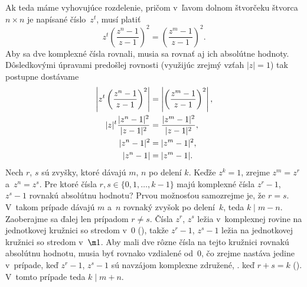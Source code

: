 {Ak teda máme vyhovujúce rozdelenie, pričom v~ľavom dolnom štvorčeku štvorca $n\times n$ je napísané číslo~$z^t$, musí platiť
$$
z^t\left(\frac{z^n-1}{z-1}\right)^2=\left(\frac{z^m-1}{z-1}\right)^2.
$$
Aby sa dve komplexné čísla rovnali, musia sa rovnať aj ich absolútne hodnoty. Dôsledkovými úpravami predošlej rovnosti (využijúc zrejmý vzťah $|z|=1$) tak postupne dostávame
$$
\aligned
\left|z^t\left(\frac{z^n-1}{z-1}\right)^2\right|&=\left|\left(\frac{z^m-1}{z-1}\right)^2\right|,\\
|z|^t\frac{|z^n-1|^2}{|z-1|^2}&=\frac{|z^m-1|^2}{|z-1|^2},\\
|z^n-1|^2&=|z^m-1|^2,\\
|z^n-1|&=|z^m-1|.\\
\endaligned
$$
Nech $r$, $s$ sú zvyšky, ktoré dávajú $m$, $n$ po delení $k$. Keďže $z^k=1$, zrejme $z^m=z^r$ a~$z^n=z^s$. Pre ktoré čísla $r,s\in\{0,1,\dots,k-1\}$ majú komplexné čísla $z^r-1$, $z^s-1$ rovnakú absolútnu hodnotu? Prvou možnosťou samozrejme je, že $r=s$. V~takom prípade dávajú $m$ a~$n$ rovnaký zvyšok po delení~$k$, teda $k\mid m-n$. Zaoberajme sa ďalej len prípadom $r\ne s$. Čísla $z^r$, $z^s$ ležia v~komplexnej rovine na jednotkovej kružnici so stredom v~$0$ (), takže $z^r-1$, $z^s-1$ ležia na jednotkovej kružnici so stredom v~$\m1$. Aby mali dve rôzne čísla na tejto kružnici rovnakú absolútnu hodnotu, musia byť rovnako vzdialené od~$0$, čo zrejme nastáva jedine v~prípade, keď $z^r-1$, $z^s-1$ sú navzájom komplexne združené, \tj. keď $r+s=k$ (\obr). V~tomto prípade teda $k\mid m+n$.
%

}

